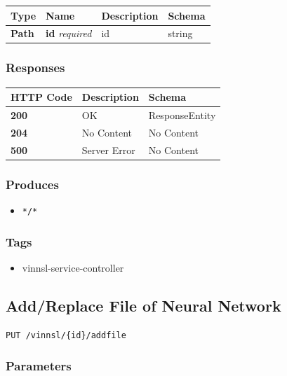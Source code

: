 \begin{longtable}[]{@{}llll@{}}
\toprule
Type & Name & Description & Schema\tabularnewline
\midrule
\endhead
\textbf{Path} & \textbf{id} \emph{required} & id & string\tabularnewline
\bottomrule
\end{longtable}

\subsubsection{Responses}\label{responses-4}

\begin{longtable}[]{@{}lll@{}}
\toprule
HTTP Code & Description & Schema\tabularnewline
\midrule
\endhead
\textbf{200} & OK & ResponseEntity\tabularnewline
\textbf{204} & No Content & No Content\tabularnewline
\textbf{500} & Server Error & No Content\tabularnewline
\bottomrule
\end{longtable}

\subsubsection{Produces}\label{produces-4}

\begin{itemize}
\tightlist
\item
  \texttt{*/*}
\end{itemize}

\subsubsection{Tags}\label{tags-4}

\begin{itemize}
\tightlist
\item
  vinnsl-service-controller
\end{itemize}

\subsection{Add/Replace File of Neural
Network}\label{addreplace-file-of-neural-network}

\begin{verbatim}
PUT /vinnsl/{id}/addfile
\end{verbatim}

\subsubsection{Parameters}\label{parameters-4}

